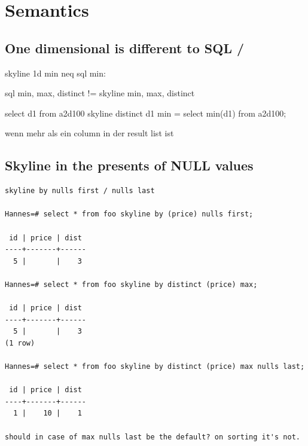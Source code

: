 \section{Semantics}

\subsection{One dimensional  is different to SQL /}

skyline 1d min neq sql min:

sql min, max, distinct != skyline min, max, distinct


select d1 from a2d100 skyline distinct d1 min = select min(d1) from a2d100;


wenn mehr als ein column in der result list ist



\subsection{Skyline in the presents of NULL values}
\begin{verbatim}
skyline by nulls first / nulls last

Hannes=# select * from foo skyline by (price) nulls first;

 id | price | dist
----+-------+------
  5 |       |    3

Hannes=# select * from foo skyline by distinct (price) max;

 id | price | dist
----+-------+------
  5 |       |    3
(1 row)

Hannes=# select * from foo skyline by distinct (price) max nulls last;

 id | price | dist
----+-------+------
  1 |    10 |    1

should in case of max nulls last be the default? on sorting it's not.
\end{verbatim}


